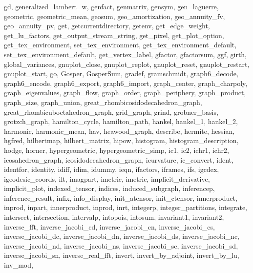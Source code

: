 {{    gd,
    generalized_lambert_w,
    genfact,
    genmatrix,
    gensym,
    gen_laguerre,
    geometric,
    geometric_mean,
    geosum,
    geo_amortization,
    geo_annuity_fv,
    geo_annuity_pv,
    get,
    getcurrentdirectory,
    getenv,
    get_edge_weight,
    get_lu_factors,
    get_output_stream_string,
    get_pixel,
    get_plot_option,
    get_tex_environment,
    set_tex_environment,
    get_tex_environment_default,
    set_tex_environment_default,
    get_vertex_label,
    gfactor,
    gfactorsum,
    ggf,
    girth,
    global_variances,
    gnuplot_close,
    gnuplot_replot,
    gnuplot_reset,
    gnuplot_restart,
    gnuplot_start,
    go,
    Gosper,
    GosperSum,
    gradef,
    gramschmidt,
    graph6_decode,
    graph6_encode,
    graph6_export,
    graph6_import,
    graph_center,
    graph_charpoly,
    graph_eigenvalues,
    graph_flow,
    graph_order,
    graph_periphery,
    graph_product,
    graph_size,
    graph_union,
    great_rhombicosidodecahedron_graph,
    great_rhombicuboctahedron_graph,
    grid_graph,
    grind,
    grobner_basis,
    grotzch_graph,
    hamilton_cycle,
    hamilton_path,
    hankel,
    hankel_1,
    hankel_2,
    harmonic,
    harmonic_mean,
    hav,
    heawood_graph,
    describe,
    hermite,
    hessian,
    hgfred,
    hilbertmap,
    hilbert_matrix,
    hipow,
    histogram,
    histogram_description,
    hodge,
    horner,
    hypergeometric,
    hypergeometric_simp,
    ic1,
    ic2,
    ichr1,
    ichr2,
    icosahedron_graph,
    icosidodecahedron_graph,
    icurvature,
    ic_convert,
    ident,
    identfor,
    identity,
    idiff,
    idim,
    idummy,
    ieqn,
    ifactors,
    iframes,
    ifs,
    igcdex,
    igeodesic_coords,
    ilt,
    imagpart,
    imetric,
    imetric,
    implicit_derivative,
    implicit_plot,
    indexed_tensor,
    indices,
    induced_subgraph,
    inferencep,
    inference_result,
    infix,
    info_display,
    init_atensor,
    init_ctensor,
    innerproduct,
    inprod,
    inpart,
    innerproduct,
    inprod,
    inrt,
    integerp,
    integer_partitions,
    integrate,
    intersect,
    intersection,
    intervalp,
    intopois,
    intosum,
    invariant1,
    invariant2,
    inverse_fft,
    inverse_jacobi_cd,
    inverse_jacobi_cn,
    inverse_jacobi_cs,
    inverse_jacobi_dc,
    inverse_jacobi_dn,
    inverse_jacobi_ds,
    inverse_jacobi_nc,
    inverse_jacobi_nd,
    inverse_jacobi_ns,
    inverse_jacobi_sc,
    inverse_jacobi_sd,
    inverse_jacobi_sn,
    inverse_real_fft,
    invert,
    invert_by_adjoint,
    invert_by_lu,
    inv_mod,
}}

